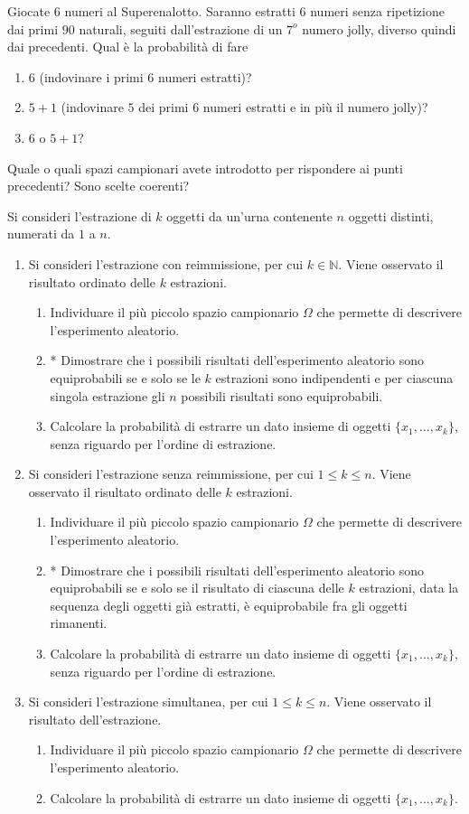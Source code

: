 Giocate $6$ numeri al Superenalotto. Saranno estratti $6$ numeri senza ripetizione dai primi $90$ naturali, seguiti dall'estrazione di un $7^{o}$ numero jolly, diverso quindi dai precedenti. Qual è la probabilità di fare
\begin{enumerate}
\item $6$ (indovinare i primi $6$ numeri estratti)?
\item $5+1$ (indovinare $5$ dei primi $6$ numeri estratti e in più il numero jolly)?
\item $6$ o $5+1$?
\end{enumerate}

Quale o quali spazi campionari avete introdotto per rispondere ai punti precedenti? Sono scelte coerenti?
\Esercizio{}

Si consideri l'estrazione di $k$ oggetti da un'urna contenente $n$ oggetti distinti, numerati da $1$ a $n$.
\begin{enumerate}
\item Si consideri l'estrazione con reimmissione, per cui $k\in \mathbb{N}$. Viene osservato il risultato ordinato delle $k$ estrazioni.
\begin{enumerate}
\item Individuare il più piccolo spazio campionario $\Omega $ che permette di descrivere l'esperimento aleatorio.
\item * Dimostrare che i possibili risultati dell'esperimento aleatorio sono equiprobabili se e solo se le $k$ estrazioni sono indipendenti e per ciascuna singola estrazione gli $n$ possibili risultati sono equiprobabili.
\item Calcolare la probabilità di estrarre un dato insieme di oggetti $\{x_{1} ,\dotsc ,x_{k}\}$, senza riguardo per l'ordine di estrazione.
\end{enumerate}
\item Si consideri l'estrazione senza reimmissione, per cui $1\leq k\leq n$. Viene osservato il risultato ordinato delle $k$ estrazioni.
\begin{enumerate}
\item Individuare il più piccolo spazio campionario $\Omega $ che permette di descrivere l'esperimento aleatorio.
\item * Dimostrare che i possibili risultati dell'esperimento aleatorio sono equiprobabili se e solo se il risultato di ciascuna delle $k$ estrazioni, data la sequenza degli oggetti già estratti, è equiprobabile fra gli oggetti rimanenti.
\item Calcolare la probabilità di estrarre un dato insieme di oggetti $\{x_{1} ,\dotsc ,x_{k}\}$, senza riguardo per l'ordine di estrazione.
\end{enumerate}
\item Si consideri l'estrazione simultanea, per cui $1\leq k\leq n$. Viene osservato il risultato dell'estrazione.
\begin{enumerate}
\item Individuare il più piccolo spazio campionario $\Omega $ che permette di descrivere l'esperimento aleatorio.
\item Calcolare la probabilità di estrarre un dato insieme di oggetti $\{x_{1} ,\dotsc ,x_{k}\}$.
\end{enumerate}
\end{enumerate}
